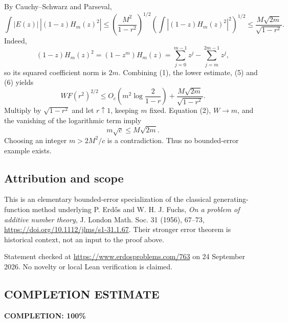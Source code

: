 By Cauchy--Schwarz and Parseval,
\[
\int |E(z)|\,|(1-z)H_m(z)^2|
 \leq\left(\frac{M^2}{1-r^2}\right)^{1/2}
       \left(\int|(1-z)H_m(z)^2|^2\right)^{1/2}
 \leq\frac{M\sqrt{2m}}{\sqrt{1-r^2}}. \tag{6}
\]
Indeed,
\[
(1-z)H_m(z)^2=(1-z^m)H_m(z)
=\sum_{j=0}^{m-1}z^j-\sum_{j=m}^{2m-1}z^j,
\]
so its squared coefficient norm is \(2m\). Combining (1), the lower estimate, (5) and (6) yields
\[
W F(r^2)^{2/2}
\leq O_c\left(m^2\log\frac{2}{1-r}\right)
 +\frac{M\sqrt{2m}}{\sqrt{1-r^2}}.
\]
Multiply by \(\sqrt{1-r^2}\) and let \(r\uparrow1\), keeping \(m\) fixed. Equation (2), \(W\to m\), and the vanishing of the logarithmic term imply
\[
m\sqrt c\leq M\sqrt{2m}.
\]
Choosing an integer \(m>2M^2/c\) is a contradiction. Thus no bounded-error example exists.

\subsection*{Attribution and scope}

This is an elementary bounded-error specialization of the classical generating-function method underlying P. Erd\H{o}s and W. H. J. Fuchs, \emph{On a problem of additive number theory}, J. London Math. Soc. 31 (1956), 67--73, \url{https://doi.org/10.1112/jlms/s1-31.1.67}. Their stronger error theorem is historical context, not an input to the proof above.

Statement checked at \url{https://www.erdosproblems.com/763} on 24 September 2026. No novelty or local Lean verification is claimed.
\subsection*{COMPLETION ESTIMATE}
\textbf{COMPLETION: 100\%}
